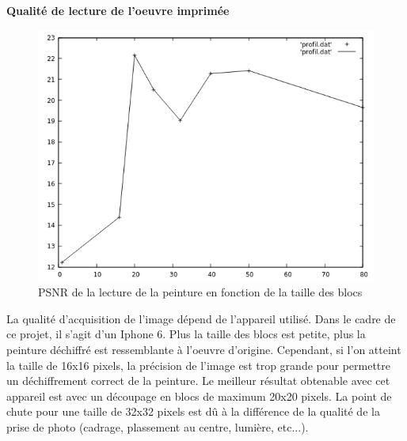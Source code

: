 \documentclass{beamer}
\begin{document}
\begin{frame}[t]
\begin{columns}[t]
\begin{column}{.49\linewidth}

                \begin{block}{\centering \textbf{Qualité de lecture de l'oeuvre imprimée}}
                    \vspace{0.5cm}

                    \begin{center}
                        \begin{figure}[t]
                            \includegraphics[width=.5\linewidth]{rsc/psnr_lecture.png}
                            \caption{\centering PSNR de la lecture de la peinture en fonction de la taille des blocs}
                        \end{figure}
                    \end{center}

                    La qualité d'acquisition de l'image dépend de l'appareil utilisé. Dans le cadre de ce projet, il s'agit d'un Iphone 6.
                    Plus la taille des blocs est petite, plus la peinture déchiffré est ressemblante à l'oeuvre d'origine. Cependant, si l'on atteint la taille de 16x16 pixels, la précision de l'image est trop grande pour permettre un déchiffrement correct de la peinture.
                    Le meilleur résultat obtenable avec cet appareil est avec un découpage en blocs de maximum 20x20 pixels.
                    La point de chute pour une taille de 32x32 pixels est dû à la différence de la qualité de la prise de photo (cadrage, plassement au centre, lumière, etc...).

                    \vspace{0.5cm}
                \end{block}
            \end{column}
        \end{columns}
    \end{frame}
\end{document}

